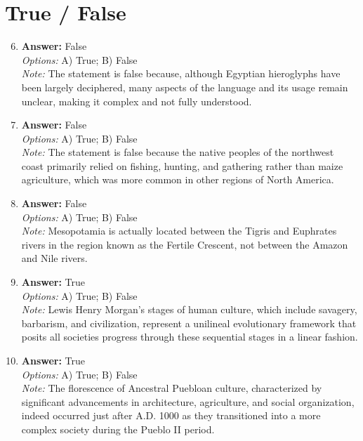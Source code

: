 \documentclass[12pt]{article}
\begin{document}
\section*{True / False}
\begin{enumerate}[label=\arabic*.]
\setcounter{enumi}{5}
\item \textbf{Answer:} False
\\ \textit{Options:} A) True; B) False
\\ \textit{Note:} The statement is false because, although Egyptian hieroglyphs have been largely deciphered, many aspects of the language and its usage remain unclear, making it complex and not fully understood.
\item \textbf{Answer:} False
\\ \textit{Options:} A) True; B) False
\\ \textit{Note:} The statement is false because the native peoples of the northwest coast primarily relied on fishing, hunting, and gathering rather than maize agriculture, which was more common in other regions of North America.
\item \textbf{Answer:} False
\\ \textit{Options:} A) True; B) False
\\ \textit{Note:} Mesopotamia is actually located between the Tigris and Euphrates rivers in the region known as the Fertile Crescent, not between the Amazon and Nile rivers.
\item \textbf{Answer:} True
\\ \textit{Options:} A) True; B) False
\\ \textit{Note:} Lewis Henry Morgan's stages of human culture, which include savagery, barbarism, and civilization, represent a unilineal evolutionary framework that posits all societies progress through these sequential stages in a linear fashion.
\item \textbf{Answer:} True
\\ \textit{Options:} A) True; B) False
\\ \textit{Note:} The florescence of Ancestral Puebloan culture, characterized by significant advancements in architecture, agriculture, and social organization, indeed occurred just after A.D. 1000 as they transitioned into a more complex society during the Pueblo II period.
\end{enumerate}
\end{document}
